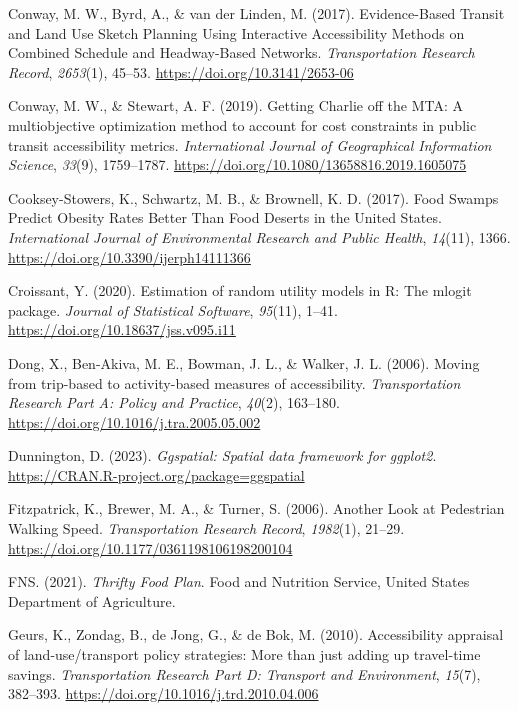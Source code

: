 \documentclass[
  letterpaper,
  number,
  review,
  3p]{elsarticle}
\newlength{\cslhangindent}
\newenvironment{CSLReferences}[2] %
 {\begin{list}{}{%
  \setlength{\itemindent}{0pt}
  \setlength{\leftmargin}{0pt}
  \setlength{\parsep}{0pt}
  \ifodd #1
   \setlength{\leftmargin}{\cslhangindent}
   \setlength{\itemindent}{-1\cslhangindent}
  \fi
  \setlength{\itemsep}{#2\baselineskip}}}
 {\end{list}}
\begin{document}
\begin{CSLReferences}{1}{0}
Conway, M. W., Byrd, A., \& van der Linden, M. (2017). Evidence-{Based
Transit} and {Land Use Sketch Planning Using Interactive Accessibility
Methods} on {Combined Schedule} and {Headway-Based Networks}.
\emph{Transportation Research Record}, \emph{2653}(1), 45--53.
\url{https://doi.org/10.3141/2653-06}

Conway, M. W., \& Stewart, A. F. (2019). Getting {Charlie} off the
{MTA}: A multiobjective optimization method to account for cost
constraints in public transit accessibility metrics. \emph{International
Journal of Geographical Information Science}, \emph{33}(9), 1759--1787.
\url{https://doi.org/10.1080/13658816.2019.1605075}

Cooksey-Stowers, K., Schwartz, M. B., \& Brownell, K. D. (2017). Food
{Swamps Predict Obesity Rates Better Than Food Deserts} in the {United
States}. \emph{International Journal of Environmental Research and
Public Health}, \emph{14}(11), 1366.
\url{https://doi.org/10.3390/ijerph14111366}

Croissant, Y. (2020). Estimation of random utility models in {R}: The
{mlogit} package. \emph{Journal of Statistical Software}, \emph{95}(11),
1--41. \url{https://doi.org/10.18637/jss.v095.i11}

Dong, X., Ben-Akiva, M. E., Bowman, J. L., \& Walker, J. L. (2006).
Moving from trip-based to activity-based measures of accessibility.
\emph{Transportation Research Part A: Policy and Practice},
\emph{40}(2), 163--180. \url{https://doi.org/10.1016/j.tra.2005.05.002}

Dunnington, D. (2023). \emph{Ggspatial: Spatial data framework for
ggplot2}. \url{https://CRAN.R-project.org/package=ggspatial}

Fitzpatrick, K., Brewer, M. A., \& Turner, S. (2006). Another {Look} at
{Pedestrian Walking Speed}. \emph{Transportation Research Record},
\emph{1982}(1), 21--29.
\url{https://doi.org/10.1177/0361198106198200104}

FNS. (2021). \emph{Thrifty {Food Plan}}. {Food and Nutrition Service,
United States Department of Agriculture}.

Geurs, K., Zondag, B., de Jong, G., \& de Bok, M. (2010). Accessibility
appraisal of land-use/transport policy strategies: {More} than just
adding up travel-time savings. \emph{Transportation Research Part D:
Transport and Environment}, \emph{15}(7), 382--393.
\url{https://doi.org/10.1016/j.trd.2010.04.006}


\end{CSLReferences}
\end{document}
